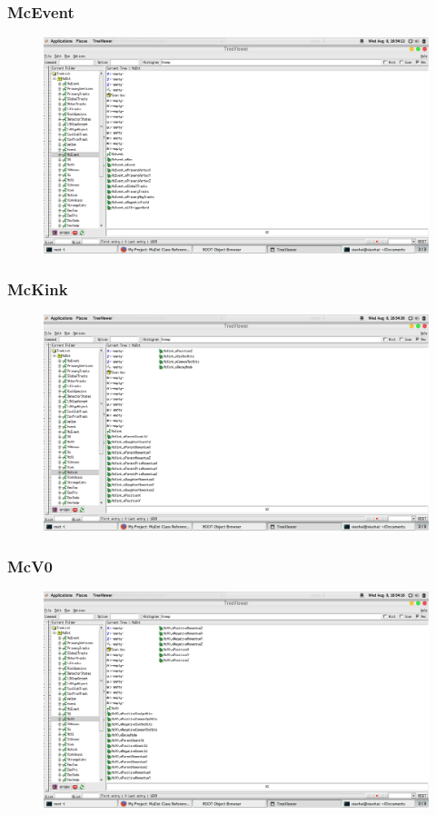 \documentclass[10pt]{beamer}
\begin{document}
\label{McEvent}
\begin{frame}
  \frametitle{McEvent}
  \begin{figure}[hbtp]
    \centering
    \includegraphics[width=\textwidth]{McEvent.png}
  \end{figure}
\end{frame}
\label{McKink}
\begin{frame}
  \frametitle{McKink}
  \begin{figure}[hbtp]
    \centering
    \includegraphics[width=\textwidth]{McKink.png}
  \end{figure}
\end{frame}
\label{McV0}
\begin{frame}
  \frametitle{McV0}
  \begin{figure}[hbtp]
    \centering
    \includegraphics[width=\textwidth]{McV0.png}
  \end{figure}
\end{frame}
\end{document}
